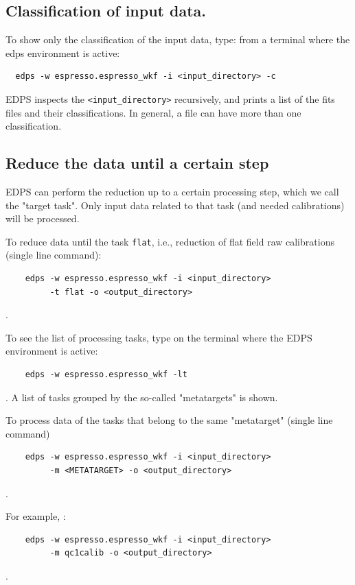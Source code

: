 \subsection{Classification of input data.}
\label{sec:edps_classification}
To show only the classification of the input data, type:
 from a terminal where the edps environment is active:
\begin{verbatim}
  edps -w espresso.espresso_wkf -i <input_directory> -c
\end{verbatim}

EDPS inspects the {\tt <input\_directory>} recursively, and prints a list of the fits files and their classifications. In general, a file can have more than one classification.


\subsection{Reduce the data until a certain step}
\label{sec:edps_target}

EDPS can perform the reduction up to a certain processing step, which we call the "target task". Only input data related to that task (and needed calibrations) will be processed.

To reduce data until the task {\tt flat}, i.e., reduction of flat field raw calibrations (single line command):
\begin{verbatim}
    edps -w espresso.espresso_wkf -i <input_directory> 
         -t flat -o <output_directory> 
\end{verbatim}.

To see the list of processing tasks, type on the terminal where the EDPS environment is active: 
\begin{verbatim}
    edps -w espresso.espresso_wkf -lt
\end{verbatim}. 
A list of tasks grouped by the so-called "metatargets" is shown.


To process data of the tasks that belong to the same "metatarget" (single line command)
\begin{verbatim}
    edps -w espresso.espresso_wkf -i <input_directory>
         -m <METATARGET> -o <output_directory>
\end{verbatim}. 

For example, :
\begin{verbatim}
    edps -w espresso.espresso_wkf -i <input_directory>
         -m qc1calib -o <output_directory> 
\end{verbatim}. 

